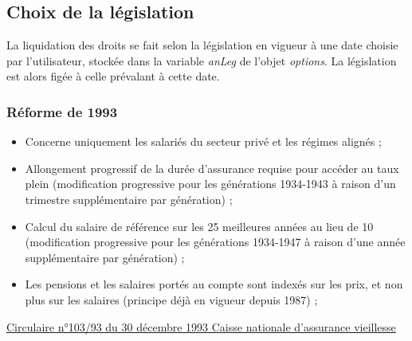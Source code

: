\subsection{Choix de la législation}
La liquidation des droits se fait selon la législation en vigueur à une date choisie par l'utilisateur, stockée dans la variable \textit{anLeg} de l'objet \textit{options}. La législation est alors figée à celle prévalant à cette date.

\subsubsection{Réforme de 1993}

\begin{itemize}
\item	Concerne uniquement les salariés du secteur privé et les régimes alignés ;
\item Allongement progressif de la durée d'assurance requise pour accéder au taux plein (modification progressive pour les générations 1934-1943 à raison d'un trimestre supplémentaire par génération) ;
\item	Calcul du salaire de référence sur les 25 meilleures années au lieu de 10 (modification progressive pour les générations 1934-1947 à raison d'une année supplémentaire par génération) ;
\item	Les pensions et les salaires portés au compte sont indexés sur les prix, et non plus sur les salaires (principe déjà en vigueur depuis 1987) ;
\end{itemize}
\href{http://www.legislation.cnav.fr/textes/cr/cn/TLR-CR_CN_10393_30121993.htm#323}%
{Circulaire n°103/93 du 30 décembre 1993 Caisse nationale d'assurance vieillesse}
